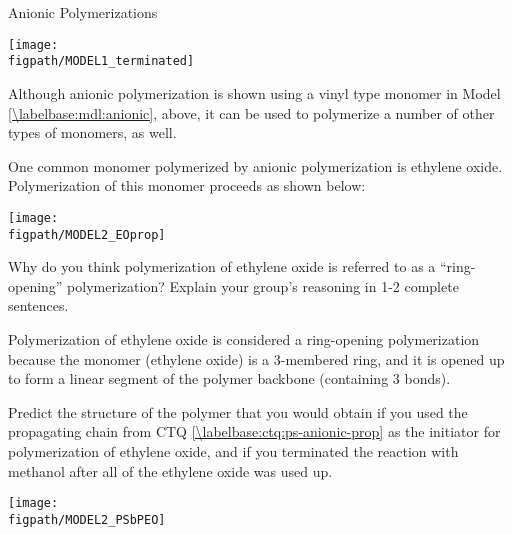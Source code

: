 \begin{activity}{Anionic Polymerizations}
\begin{ctqs}
		\begin{solution}[2in]{}
		\centerline{\texttt{[image: \\figpath/MODEL1\_terminated]}}
		\end{solution}

		
\end{ctqs}


\clearpage
\begin{model}
	\label{\labelbase:mdl:anionicEO}

	Although anionic polymerization is shown using a vinyl type monomer in Model \ref{\labelbase:mdl:anionic}, above, it can be used to polymerize a number of other types of monomers, as well.
	
	One common monomer polymerized by anionic polymerization is ethylene oxide.  Polymerization of this monomer proceeds as shown below:
	
	\centerline{\texttt{[image: \\figpath/MODEL2\_EOprop]}}

\end{model}

\begin{ctqs}
	
	\question Why do you think polymerization of ethylene oxide is referred to as a ``ring-opening'' polymerization?  Explain your group's reasoning in 1-2 complete sentences.
	
		\begin{solution}[1in]{}
			Polymerization of ethylene oxide is considered a ring-opening polymerization because the monomer (ethylene oxide) is a 3-membered ring, and it is opened up to form a linear segment of the polymer backbone (containing 3 bonds).
		\end{solution}
	
	\question Predict the structure of the polymer that you would obtain if you used the propagating chain from CTQ \ref{\labelbase:ctq:ps-anionic-prop} as the initiator for polymerization of ethylene oxide, and if you terminated the reaction with methanol after all of the ethylene oxide was used up.
	
		\begin{solution}[1.75in]{}
			\centerline{\texttt{[image: \\figpath/MODEL2\_PSbPEO]}}
			

\end{solution}
\end{ctqs}
\end{activity}

